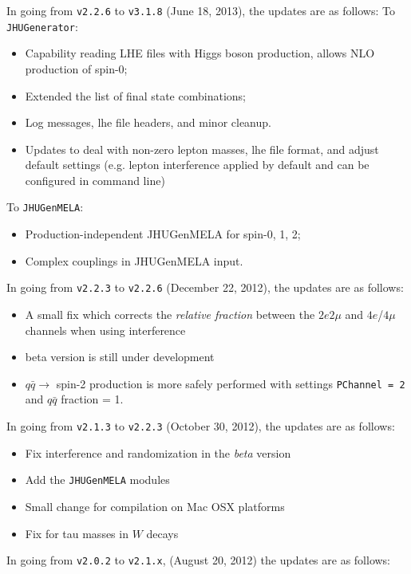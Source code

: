 \documentclass[aps,superscriptaddress,nofootinbib]{revtex4}
\begin{document}
\noindent
In going from \verb|v2.2.6| to \verb|v3.1.8| (June 18, 2013), the updates are as follows:
To \verb|JHUGenerator|:
\begin{itemize}
\item Capability reading LHE files with Higgs boson production, allows NLO production of spin-0;
\item Extended the list of final state combinations;
\item Log messages, lhe file headers, and minor cleanup.
\item Updates to deal with non-zero lepton masses, lhe file format, and adjust default settings (e.g. lepton interference applied by default and can be configured in command line)
\end{itemize}
To \verb|JHUGenMELA|:
\begin{itemize}
\item Production-independent JHUGenMELA for spin-0, 1, 2;
\item Complex couplings in JHUGenMELA input.
\end{itemize}
\noindent
In going from \verb|v2.2.3| to \verb|v2.2.6| (December 22, 2012), the updates are as follows:
\begin{itemize}
\item A small fix which corrects the {\it relative fraction} between the $2e2\mu$ and $4e$/$4\mu$ channels when using interference
\item beta version is still under development
\item $q\bar{q} \to$ spin-2 production is more safely performed with settings \verb|PChannel = 2| and $q\bar{q}$ fraction = 1.
\end{itemize}
\noindent
In going from \verb|v2.1.3| to \verb|v2.2.3| (October 30, 2012), the updates are as follows:
\begin{itemize}
\item Fix interference and randomization in the {\it{beta}} version
\item Add the \verb|JHUGenMELA| modules
\item Small change for compilation on Mac OSX platforms
\item Fix for tau masses in $W$ decays
\end{itemize}
\noindent
In going from \verb|v2.0.2| to \verb|v2.1.x|, (August 20, 2012) the updates are as follows:
\end{document}

